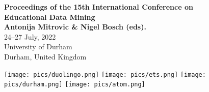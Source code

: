 \documentclass[letterpaper,11pt,oneside]{book} %
\begin{document}
\thispagestyle{empty}

\begin{center}
  \vspace*{55mm}
    {\bf
    \LARGE
    Proceedings of the 15th International Conference on \\ Educational Data Mining\\
    \vspace{1cm}
    \Large
    Antonija Mitrovic \& Nigel Bosch (eds).
    \vspace{3cm} %
    \hspace*{1cm}} \\ %
    \Large%
    24--27 July, 2022\\
    University of Durham \\
    Durham, United Kingdom
  \end{center}
  
%
\vspace*{\fill}
\begin{center}
\texttt{[image: pics/duolingo.png]} \quad \texttt{[image: pics/ets.png]} \quad \texttt{[image: pics/durham.png]}  \quad 
\texttt{[image: pics/atom.png]} 
\end{center}
\end{document}
